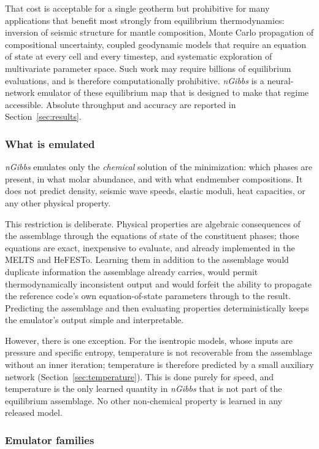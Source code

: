 That cost is acceptable for a single geotherm but prohibitive for many applications
that benefit most strongly from equilibrium thermodynamics: inversion of seismic structure for mantle
composition, Monte Carlo propagation of compositional uncertainty, coupled
geodynamic models that require an equation of state at every cell and every
timestep, and systematic exploration of multivariate parameter space. Such work may require
billions of equilibrium evaluations, and is therefore computationally prohibitive.  \emph{nGibbs} is a neural-network
emulator of these equilibrium map that is designed to make that regime accessible.
Absolute throughput and accuracy are reported in Section~\ref{sec:results}.

\subsubsection{What is emulated}

 \emph{nGibbs} emulates only the
\emph{chemical} solution of the minimization: which phases are present, in what
molar abundance, and with what endmember compositions. It does not predict density,
seismic wave speeds, elastic moduli, heat capacities, or any other physical
property.

This restriction is deliberate. Physical properties are algebraic consequences of
the assemblage through the equations of state of the constituent phases; those
equations are exact, inexpensive to evaluate, and already implemented in the
MELTS and HeFESTo. Learning them in addition to the assemblage would duplicate
information the assemblage already carries, would permit thermodynamically
inconsistent output and would forfeit the ability to propagate the reference code's own
equation-of-state parameters through to the result. Predicting the assemblage and
then evaluating properties deterministically keeps the emulator's output simple and interpretable.

However, there is one exception. For the isentropic models, whose inputs are pressure
and specific entropy, temperature is not recoverable from the assemblage without an
inner iteration; temperature is therefore predicted by a small auxiliary network
(Section~\ref{sec:temperature}). This is done purely for speed, and temperature is
the only learned quantity in \emph{nGibbs} that is not part of the equilibrium
assemblage. No other non-chemical property is learned in any released model.

\subsubsection{Emulator families}

